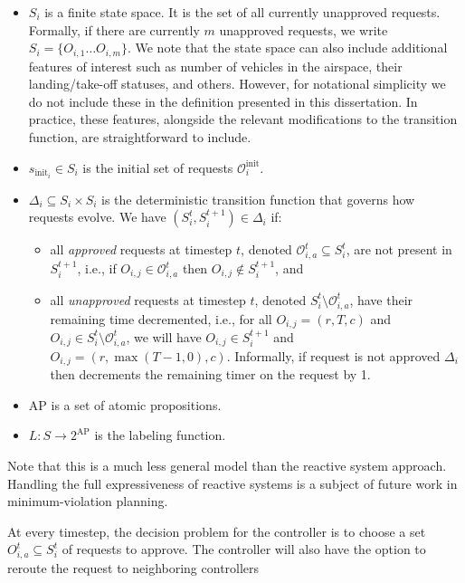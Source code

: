 \begin{itemize}
    \item $S_i$ is a finite state space.  It is the set of all currently unapproved requests. Formally, if there are currently $m$ unapproved requests, we write $S_i = \{O_{i,1} \dots O_{i,m}\}$. We note that the state space can also include additional features of interest such as number of vehicles in the airspace, their landing/take-off statuses, and others. However, for notational simplicity we do not include these in the definition presented in this dissertation. In practice, these features, alongside the relevant modifications to the transition function, are straightforward to include. 
    \item $s_{\text{init}_i} \in S_i$ is the initial set of requests $\mathcal{O}^{\text{init}}_i$.
    \item $\Delta_i \subseteq S_i \times S_i$ is the deterministic transition function that governs how requests evolve. We have $\left(S^t_i,S^{t+1}_i \right) \in \Delta_i$ if:

    \begin{itemize}
        \item all \emph{approved} requests at timestep $t$, denoted $\mathcal O_{i,a}^t \subseteq S^t_i$,  are not present in $S^{t+1}_i$, i.e., if $O_{i,j} \in  \mathcal O_{i,a}^t$ then $O_{i,j} \notin S^{t+1}_i$, and
        \item all \emph{unapproved} requests at timestep $t$, denoted $S^{t}_i \setminus \mathcal O_{i,a}^t$, have their remaining time decremented, i.e., for all $O_{i,j} = (r,T,c)$ and $O_{i,j} \in S^{t}_i \setminus \mathcal{O}_{i,a}^t$, we will have $O_{i,j} \in S^{t+1}_i$ and $O_{i,j} = (r,\max(T-1,0),c)$. Informally, if request is not approved $\Delta_i$ then decrements the remaining timer on the request by 1. 
    \end{itemize}
    \item $\text{AP}$ is a set of atomic propositions.
    \item  $L:S\rightarrow 2^{\text{AP}}$ is the labeling function.
\end{itemize}

Note that this is a much less general model than the reactive system approach. Handling the full expressiveness of reactive systems is a subject of future work in minimum-violation planning. 

At every timestep, the decision problem for the controller is to choose a set $O_{i,a}^t \subseteq S^{t}_i$ of requests to approve. The controller will also have the option to reroute the request to neighboring controllers

